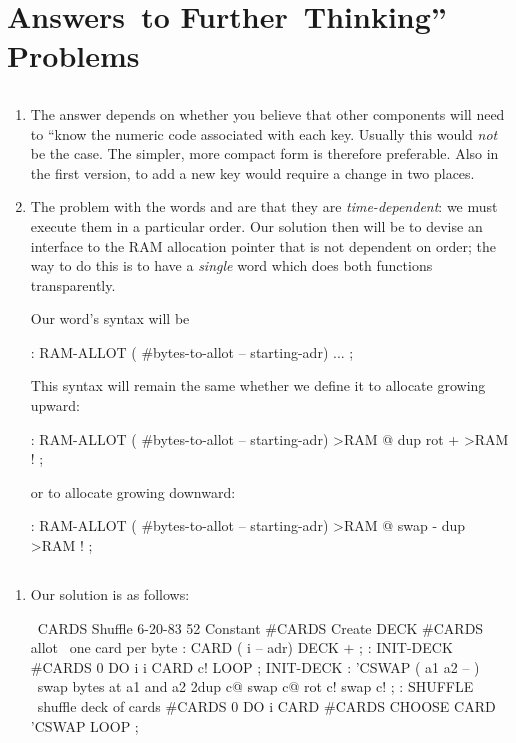 
\chapter{Answers~to
Further~Thinking''
Problems}
\section{}
\begin{enumerate}
\item The answer depends on whether you believe that other components will
need to ``know the numeric code associated with each key.  Usually this
would \emph{not} be the case.  The simpler, more compact form is therefore
preferable.  Also in the first version, to add a new key would require a
change in two places.
\item The problem with the words  and  are
that they are \emph{time-dependent}:  we must execute them in a particular
order.  Our solution then will be to devise an interface to the RAM
allocation pointer that is not dependent on order; the way to do this is
to have a \emph{single} word which does both functions transparently.

Our word's syntax will be
\begin{Code}
: RAM-ALLOT   ( #bytes-to-allot -- starting-adr) 
    ... ;
\end{Code}
This syntax will remain the same whether we define it to allocate growing 
upward:
\begin{Code}
: RAM-ALLOT  ( #bytes-to-allot -- starting-adr)
    >RAM @  dup rot +  >RAM ! ;
\end{Code}
or to allocate growing downward:
\begin{Code}
: RAM-ALLOT  ( #bytes-to-allot -- starting-adr)
    >RAM @  swap -  dup >RAM ! ;
\end{Code}
\end{enumerate}

\section{}

\ifeightyfour\begin{enumerate}
\item\fi Our solution is as follows:
\begin{Code}
\ CARDS Shuffle                              6-20-83
52 Constant #CARDS
Create DECK  #CARDS allot   \ one card per byte
: CARD ( i -- adr) DECK + ;
: INIT-DECK  #CARDS 0 DO  i  i CARD  c!  LOOP ;
INIT-DECK
: 'CSWAP  ( a1 a2 -- )  \  swap bytes at a1 and a2
   2dup c@  swap c@  rot c!  swap c! ;
: SHUFFLE   \  shuffle deck of cards
   #CARDS 0 DO  i CARD  #CARDS CHOOSE CARD  'CSWAP
   LOOP ;
\end{Code}
\ifeightyfour\end{enumerate}\fi

